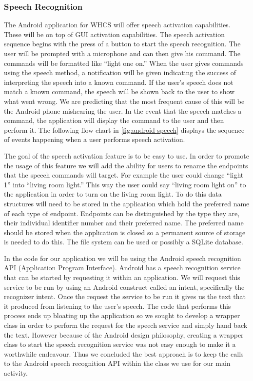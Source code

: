 
\subsubsection{Speech Recognition} The Android application for WHCS will offer
speech activation capabilities. These will be on top of GUI activation
capabilities. The speech activation sequence begins with the press of a button
to start the speech recognition. The user will be prompted with a microphone
and can then give his command. The commands will be formatted like {}``light
one on.'' When the user gives commands using the speech method, a notification
will be given indicating the success of interpreting the speech into a known
command. If the user{}'s speech does not match a known command, the speech will
be shown back to the user to show what went wrong. We are predicting that the
most frequent cause of this will be the Android phone mishearing the user. In
the event that the speech matches a command, the application will display the
command to the user and then perform it. The following flow chart in
\autoref{fig:android-speech} displays the sequence of events happening when a
user performs speech activation.


The goal of the speech activation feature is to be easy to use. In order to
promote the usage of this feature we will add the ability for users to rename
the endpoints that the speech commands will target. For example the user could
change {}``light 1'' into {}``living room light.'' This way the user could say
{}``living room light on{}'' to the application in order to turn on the living
room light. To do this data structures will need to be stored in the
application which hold the preferred name of each type of endpoint. Endpoints
can be distinguished by the type they are, their individual identifier number
and their preferred name. The preferred name should be stored when the
application is closed so a permanent source of storage is needed to do this.
The file system can be used or possibly a SQLite database.

In the code for our application we will be using the Android speech recognition
API (Application Program Interface).  Android has a speech recognition service
that can be started by requesting it within an application. We will request
this service to be run by using an Android construct called an intent,
specifically the recognizer intent. Once the request the service to be run it
gives us the text that it produced from listening to the user{}'s speech. The
code that performs this process ends up bloating up the application so we
sought to develop a wrapper class in order to perform the request for the
speech service and simply hand back the text. However because of the Android
design philosophy, creating a wrapper class to start the speech recognition
service was not easy enough to make it a worthwhile endeavour. Thus we
concluded the best approach is to keep the calls to the Android speech
recognition API within the class we use for our main activity.

